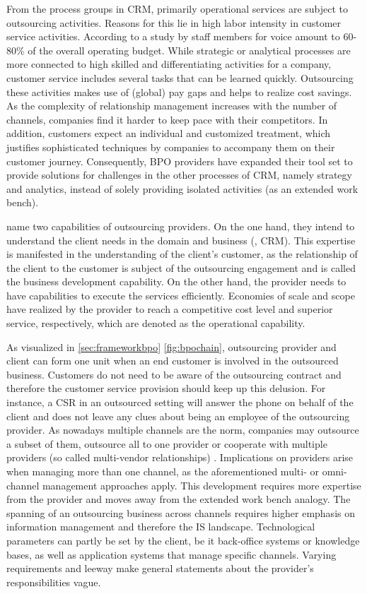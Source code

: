 		From the process groups in \acrshort{CRM}, primarily operational services are subject to outsourcing activities. Reasons for this lie in high labor intensity in customer service activities. According to a study by \cite{Aksin_2009} staff members for voice amount to 60-80\% of the overall operating budget. While strategic or analytical processes are more connected to high skilled and differentiating activities for a company, customer service includes several tasks that can be learned quickly. Outsourcing these activities makes use of (global) pay gaps and helps to realize cost savings. As the complexity of relationship management increases with the number of channels, companies find it harder to keep pace with their competitors. In addition, customers expect an individual and customized treatment, which justifies sophisticated techniques by companies to accompany them on their customer journey. Consequently, BPO providers have expanded their tool set to provide solutions for challenges in the other processes of CRM, namely strategy and analytics, instead of solely providing isolated activities (as an extended work bench).
		
		\cite{Ramachandran2004} name two capabilities of outsourcing providers. On the one hand, they intend to understand the client needs in the domain and business (\eg, CRM). This expertise is manifested in the understanding of the client's customer, as the relationship of the client to the customer is subject of the outsourcing engagement and is called the business development capability. On the other hand, the provider needs to have capabilities to execute the services efficiently. Economies of scale and scope have realized by the provider to reach a competitive cost level and superior service, respectively, which are denoted as the operational capability.
		
		As visualized in  \ref{sec:frameworkbpo} \Fig \ref{fig:bpochain}, outsourcing provider and client can form one unit when an end customer is involved in the outsourced business. Customers do not need to be aware of the outsourcing contract and therefore the customer service provision should keep up this delusion. For instance, a \acrshort{CSR} in an outsourced setting will answer the phone on behalf of the client and does not leave any clues about being an employee of the outsourcing provider. As nowadays multiple channels are the norm, companies may outsource a subset of them, outsource all to one provider or cooperate with multiple providers (so called multi-vendor relationships) . Implications on providers arise when managing more than one channel, as the aforementioned multi- or omni-channel management approaches apply. This development requires more expertise from the provider and moves away from the extended work bench analogy. The spanning of an outsourcing business across channels requires higher emphasis on information management and therefore the \acrshort{IS} landscape. Technological parameters can partly be set by the client, be it back-office systems or knowledge bases, as well as application systems that manage specific channels. Varying requirements and leeway make general statements about the provider's responsibilities vague. 
		
